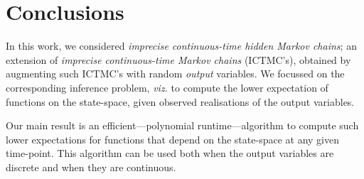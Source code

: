 \documentclass[twoside,11pt]{article}
\newcommand{\states}{\mathcal{X}}
\newcommand{\gambles}{\mathcal{L}}
\begin{document}
\section{Conclusions}\label{sec:conclusions}

In this work, we considered \emph{imprecise continuous-time hidden Markov chains}; an extension of \emph{imprecise continuous-time Markov chains} (ICTMC's), obtained by augmenting such ICTMC's with random \emph{output} variables. We focussed on the corresponding inference problem, \emph{viz.} to compute the lower expectation of functions on the state-space, given observed realisations of the output variables. 

Our main result is an efficient---polynomial runtime---algorithm to compute such lower expectations for functions that depend on the state-space at any given time-point. This algorithm can be used both when the output variables are discrete and when they are continuous.


\end{document}
